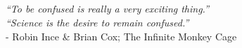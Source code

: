 

\hspace*{\fill} \\
\hspace*{\fill} \\ 
\hspace*{\fill} \\
\hspace*{\fill} \\
\hspace*{\fill} \\
\hspace*{\fill} \\ 
\hspace*{\fill} \\
\hspace*{\fill} \\
\hspace*{\fill} \\
\hspace*{\fill} \\
\hspace*{\fill} \\
\hspace*{\fill} \\
\hspace*{\fill} \\
\hspace*{\fill} \\

\begin{center}
\textit{``To be confused is really a very exciting thing.''}\\
\textit{``Science is the desire to remain confused.''}\\
- Robin Ince \& Brian Cox; The Infinite Monkey Cage\\
\hspace*{\fill} \\
\hspace*{\fill} \\



\end{center}
